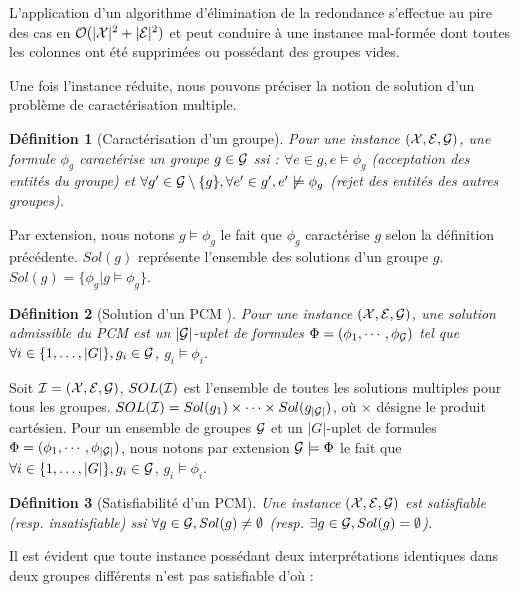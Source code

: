 \documentclass[a4paper,10pt]{article}
\newtheorem{definition}{Définition}
\begin{document}
L'application d'un algorithme d'élimination de la redondance s'effectue au pire des cas en ${\mathcal O}({|\cal X}|^2+|{\cal E}|^2)$ et peut conduire à une instance mal-formée dont toutes les colonnes ont été supprimées ou possédant des groupes vides.

Une fois l'instance réduite, nous pouvons préciser la notion de solution d'un problème de caractérisation multiple.

\begin{definition}[Caractérisation d'un groupe]
Pour une instance $({\cal X}, {\cal E}, {\cal G})$, une formule $\phi_g$
caractérise un groupe $g\in {\cal G}$ ssi :
$\forall e \in g, e \models \phi_g$ (acceptation des entités du groupe) et
$\forall g' \in {\cal G} \setminus \{g\},\forall e' \in g',  e' \not \models
\phi_g$ (rejet des entités des autres groupes).
\end{definition}

Par extension, nous notons $g \models \phi_g$ le fait que $\phi_g$ caractérise $g$ selon la définition précédente. $Sol(g)$ représente l'ensemble des solutions d'un groupe $g$. $Sol(g)=\{\phi_g|g \models \phi_g\}$.

\begin{definition}[Solution d'un PCM ]
Pour une instance $({\cal X}, {\cal E}, {\cal G})$, une solution
admissible du PCM  est un $|{\cal G}|$-uplet de formules
$\Phi=(\phi_1,\cdots,\phi_{{\cal G}})$ tel que  $\forall i\in \{1,\ldots,|G|\}, g_i \in
{\cal G}$, $g_i \models \phi_i$.
\end{definition}

Soit ${\cal I} = ({\cal X}, {\cal E}, {\cal G})$, $ SOL({\cal I})$ est
l'ensemble de toutes les solutions multiples pour tous les groupes. $SOL({\cal
I})=Sol(g_1) \times \cdots \times Sol(g_{|{\cal G}|})$, où $\times$ désigne le produit cartésien. Pour un ensemble de
groupes ${\cal G}$ et un $|G|$-uplet de formules $\Phi=(\phi_1,\cdots,\phi_{|{\cal G}|})$, nous notons par extension ${\cal G} \models \Phi$ le fait que
$\forall i\in \{1,\ldots,|G|\}, g_i \in {\cal G}$, $g_i \models \phi_i$.

\begin{definition}[Satisfiabilité d'un PCM]
Une instance $({\cal X}, {\cal E}, {\cal G})$ est satisfiable (resp. insatisfiable) ssi
$\forall g \in {\cal G}, Sol(g) \neq \emptyset$ (resp. $\exists g \in {\cal G},
Sol(g) = \emptyset$).
\end{definition}

Il est évident que toute instance possédant deux interprétations identiques dans deux groupes différents n'est pas satisfiable d'où :
\end{document}
